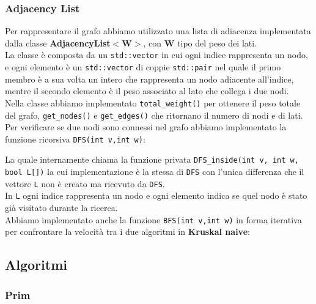 \documentclass[]{article}
\begin{document}
\subsubsection{Adjacency List}
Per rappresentare il grafo abbiamo utilizzato una lista di adiacenza implementata dalla classe \textbf{AdjacencyList$<$W$>$}, con \textbf{W} tipo del peso dei lati.\\
La classe è composta da un \verb|std::vector| in cui ogni indice rappresenta un nodo, e ogni elemento è un \verb|std::vector| di coppie \verb|std::pair| nel quale il primo membro è a sua volta un intero che rappresenta un nodo adiacente all'indice, mentre il secondo elemento è il peso associato al lato che collega i due nodi.\\
Nella classe abbiamo implementato \verb|total_weight()| per ottenere il peso totale del grafo, \verb|get_nodes()| e \verb|get_edges()| che ritornano il numero di nodi e di lati.\\
Per verificare se due nodi sono connessi nel grafo abbiamo implementato la funzione ricorsiva \verb|DFS(int v,int w)|:
\lstset{language=c++, style=mystyle}

La quale internamente chiama la funzione privata \verb|DFS_inside(int v, int w, bool L[])| la cui implementazione è la stessa di \verb|DFS| con l'unica differenza che il vettore \verb|L| non è creato ma ricevuto da \verb|DFS|.\\
In \verb|L| ogni indice rappresenta un nodo e ogni elemento indica se quel nodo è stato già visitato durante la ricerca.\\
Abbiamo implementato anche la funzione \verb|BFS(int v,int w)| in forma iterativa per confrontare la velocità tra i due algoritmi in \textbf{Kruskal naive}:
\lstset{language=c++, style=mystyle}

\subsection{Algoritmi}
\subsubsection{Prim}
\newpage
\end{document}
